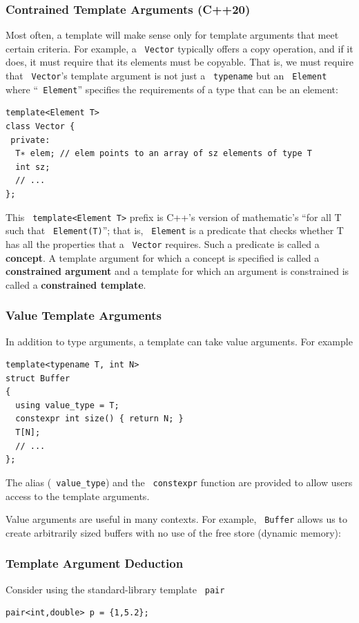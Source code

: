 \documentclass[11pt]{article}
\let\OldTexttt\texttt
\renewcommand{\texttt}[1]{\OldTexttt{\color{MidnightBlue} #1}}
\begin{document}
\subsubsection{Contrained Template Arguments (C++20)}
\label{sec:org6f072ef}
Most often, a template will make sense only for template arguments that meet certain criteria.
For example, a \texttt{Vector} typically offers a copy operation, and if it does, it must require that
its elements must be copyable. That is, we must require that \texttt{Vector}'s template argument is not
just a \texttt{typename} but an \texttt{Element} where ``\texttt{Element}'' specifies the requirements of a type that can
be an element:
\begin{verbatim}
template<Element T>
class Vector {
 private:
  T∗ elem; // elem points to an array of sz elements of type T
  int sz;
  // ...
};
\end{verbatim}
This \texttt{template<Element T>} prefix is C++'s version of mathematic's ``for all T such that
\texttt{Element(T)}''; that is, \texttt{Element} is a predicate that checks whether T has all the properties that
a \texttt{Vector} requires. Such a predicate is called a \textbf{concept}. A template argument for which a concept
is specified is called a \textbf{constrained argument} and a template for which an argument is
constrained is called a \textbf{constrained template}.
\subsubsection{Value Template Arguments}
\label{sec:org01af9df}
In addition to type arguments, a template can take value arguments. For example
\begin{verbatim}
template<typename T, int N>
struct Buffer
{
  using value_type = T;
  constexpr int size() { return N; }
  T[N];
  // ...
};
\end{verbatim}
The alias (\texttt{value\_type}) and the \texttt{constexpr} function are provided to allow users access to the
template arguments.

Value arguments are useful in many contexts. For example, \texttt{Buffer} allows us to create arbitrarily
sized buffers with no use of the free store (dynamic memory):
\subsubsection{Template Argument Deduction}
\label{sec:org0a9dbff}
Consider using the standard-library template \texttt{pair}
\begin{verbatim}
pair<int,double> p = {1,5.2};
\end{verbatim}
\end{document}
